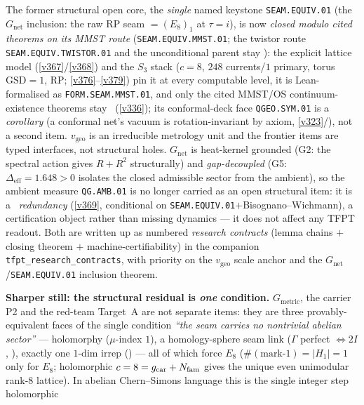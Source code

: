 \par\smallskip
\noindent The former structural open core, the \emph{single} named keystone \texttt{SEAM.EQUIV.01} (the
$G_{\mathrm{net}}$ inclusion: the raw RP seam $=(E_8)_1$ at $\tau{=}i$), is now \emph{closed modulo cited theorems
on its MMST route} (\texttt{SEAM.EQUIV.MMST.01}; the twistor route \texttt{SEAM.EQUIV.TWISTOR.01} and the
unconditional parent stay \mO):
the explicit lattice model (\vref{v367}/\vref{v368}) and the $S_3$ stack ($c{=}8$, $248$ currents/$1$ primary, torus
$\mathrm{GSD}{=}1$, RP; \vref{v376}--\vref{v379}) pin it at every computable level, it is Lean-formalised as
\texttt{FORM.SEAM.MMST.01}, and only the cited MMST/OS continuum-existence theorems stay \mO\ (\vref{v336}); its
conformal-deck face \texttt{QGEO.SYM.01} is a \emph{corollary} (a conformal net's vacuum is rotation-invariant by axiom,
\vref{v323}/), not a second item. $v_{\mathrm{geo}}$ is an irreducible metrology
unit and the frontier items are typed interfaces, not structural holes. $G_{\mathrm{net}}$ is heat-kernel
grounded (G2: the spectral action gives $R+R^2$ structurally) and \emph{gap-decoupled} (G5:
$\Delta_{\mathrm{eff}}{=}1.648{>}0$ isolates the closed admissible sector from the ambient), so the
ambient measure \texttt{QG.AMB.01} is no longer carried as an open structural item: it is a \mC\ \emph{redundancy}
(\vref{v369}, conditional on \texttt{SEAM.EQUIV.01}${+}$Bisognano--Wichmann), a certification object rather than
missing dynamics --- it does not affect any TFPT readout. Both are written up
as numbered \emph{research contracts} (lemma chains $+$ closing theorem $+$ machine-certifiability) in the
companion \texttt{tfpt\_research\_contracts}, with priority on the $v_{\mathrm{geo}}$ scale anchor and the
$G_{\mathrm{net}}$/\texttt{SEAM.EQUIV.01} inclusion theorem.
\par\smallskip\noindent\textbf{Sharper still: the structural residual is \emph{one} condition.} $G_{\mathrm{metric}}$,
the carrier P2 and the red-team Target~A are not separate items: they are three provably-equivalent faces of
the single condition \emph{``the seam carries no nontrivial abelian sector''} --- holomorphy ($\mu$-index
$1$), a homology-sphere seam link ($\Gamma$ perfect $\Leftrightarrow2I$, ),
exactly one $1$-dim irrep () --- all of which force $E_8$
($\#(\text{mark-}1)=|H_1|=1$ only for $E_8$; holomorphic $c=8=g_{\mathrm{car}}+N_{\mathrm{fam}}$ gives the unique even unimodular
rank-$8$ lattice). In abelian Chern--Simons language this is the single integer step holomorphic
